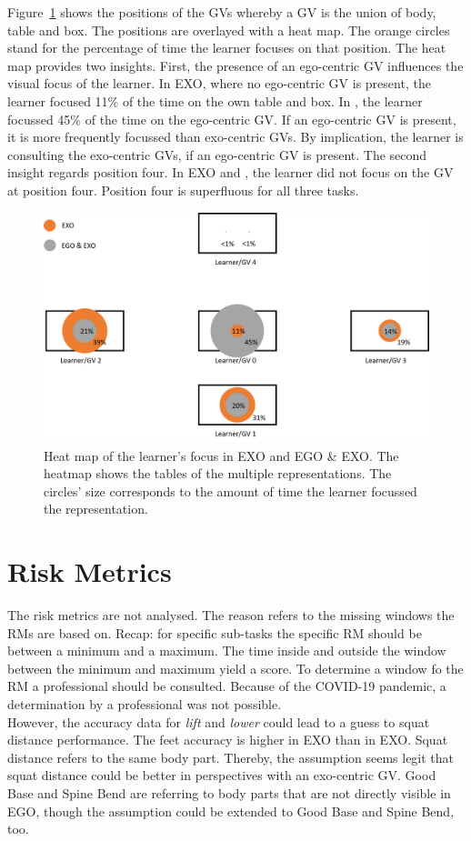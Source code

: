 Figure~\ref{fig:posHeatMap} shows the positions of the GVs whereby a GV is the union of body, table and box. The positions are overlayed with a heat map. The orange circles stand for the percentage of time the learner focuses on that position. The heat map provides two insights. First, the presence of an ego-centric GV influences the visual focus of the learner. In EXO, where no ego-centric GV is present, the learner focused 11\% of the time on the own table and box. In \combi, the learner focussed 45\% of the time on the ego-centric GV. If an ego-centric GV is present, it is more frequently focussed than exo-centric GVs. By implication, the learner is consulting the exo-centric GVs, if an ego-centric GV is present.
The second insight regards position four. In EXO and \combi, the learner did not focus on the GV at position four. Position four is superfluous for all three tasks.
\begin{figure}[htb]
	\centering
	\includegraphics[width=\textwidth]{figures/positionHeatMap.png}
	\caption[\textit{Looking at} heat map.]{Heat map of the learner's focus in EXO and EGO \& EXO. The heatmap shows the tables of the multiple representations. The circles' size corresponds to the amount of time the learner focussed the representation.}
	\label{fig:posHeatMap}
\end{figure}

\section{Risk Metrics}
The risk metrics are not analysed. The reason refers to the missing windows the RMs are based on. Recap: for specific sub-tasks the specific RM should be between a minimum and a maximum. The time inside and outside the window between the minimum and maximum yield a score. To determine a window fo the RM a professional should be consulted. Because of the COVID-19 pandemic, a determination by a professional was not possible.\\
However, the accuracy data for \textit{lift} and \textit{lower} could lead to a guess to squat distance performance. The feet accuracy is higher in EXO than in EXO. Squat distance refers to the same body part. Thereby, the assumption seems legit that squat distance could be better in perspectives with an exo-centric GV. Good Base and Spine Bend are referring to body parts that are not directly visible in EGO, though the assumption could be extended to Good Base and Spine Bend, too.

